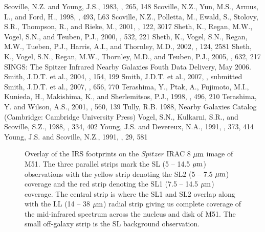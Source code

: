 \documentclass[manuscript]{aastex}
\begin{document}
\begin{thebibliography}{}
 Scoville, N.Z. and Young, J.S., 1983, \aj, 265, 148
 Scoville, N.Z., Yun, M.S., Armus, L., and Ford, H., 1998, \apj, 493, L63 
 Scoville, N.Z., Polletta, M., Ewald, S., Stolovy, S.R., Thompson, R., and Rieke, M., 2001, \aj, 122, 3017
 Sheth, K., Regan, M.W., Vogel, S.N., and Teuben, P.J., 2000, \apj, 532, 221 
 Sheth, K., Vogel, S.N., Regan, M.W., Tueben, P.J., Harris, A.I., and Thornley, M.D., 2002, \aj, 124, 2581
 Sheth, K., Vogel, S.N., Regan, M.W., Thornley, M.D., and Teuben, P.J., 2005, \apj, 632, 217
 SINGS: The Spitzer Infrared Nearby Galaxies Fouth Data Delivery, May 2006.
 Smith, J.D.T. et al., 2004, \apjs, 154, 199
 Smith, J.D.T. et al., 2007, \pasp, submitted
 Smith, J.D.T. et al., 2007, \apj, 656, 770
 Terashima, Y., Ptak, A., Fujimoto, M.I., Kunieda, H., Makishima, K., and Sherlemitsos, P.J., 1998, \apj, 496, 210
 Terashima, Y. and Wilson, A.S., 2001, \apj, 560, 139
 Tully, R.B. 1988, Nearby Galaxies Catalog (Cambridge: Cambridge University Press)
 Vogel, S.N., Kulkarni, S.R., and Scoville, S.Z., 1988, \nat, 334, 402
 Young, J.S. and Devereux, N.A., 1991, \apj, 373, 414
 Young, J.S. and Scoville, N.Z., 1991, \araa, 29, 581
\end{thebibliography}

\clearpage

\begin{figure}
\caption{Overlay of the IRS footprints on the $Spitzer$ IRAC 8 $\mbox{$\mu$m}$ image of M51.  
The three parallel strips mark the SL (5 -- 14.5 $\mbox{$\mu$m}$) observations with the yellow 
strip denoting the SL2 (5 -- 7.5 $\mbox{$\mu$m}$) coverage and the red strip 
denoting the SL1 (7.5 -- 14.5 $\mbox{$\mu$m}$) coverage.  The central strip is where the SL1
and SL2 overlap along with the LL (14 -- 38 $\mbox{$\mu$m}$) radial strip giving us complete coverage of the 
mid-infrared spectrum across the nucleus and disk of M51.  
The small off-galaxy strip is the SL background observation.}
\label{figure-1}
\end{figure}
\end{document}
